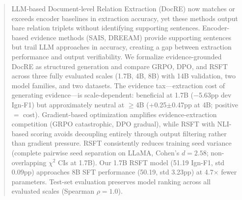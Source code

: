\begin{abstract}
LLM-based Document-level Relation Extraction (DocRE) now matches or exceeds encoder baselines in extraction accuracy, yet these methods output bare relation triplets without identifying supporting sentences. Encoder-based evidence methods (SAIS, DREEAM) provide supporting sentences but trail LLM approaches in accuracy, creating a gap between extraction performance and output verifiability.
We formalize evidence-grounded DocRE as structured generation and compare GRPO, DPO, and RSFT across three fully evaluated scales (1.7B, 4B, 8B) with 14B validation, two model families, and two datasets. The evidence tax---extraction cost of generating evidence---is scale-dependent: beneficial at 1.7B ($-$5.63pp dev Ign-F1) but approximately neutral at $\geq$4B (+0.25$\pm$0.47pp at 4B; positive $=$ cost). Gradient-based optimization amplifies evidence-extraction competition (GRPO catastrophic, DPO gradual), while RSFT with NLI-based scoring avoids decoupling entirely through output filtering rather than gradient pressure.
RSFT consistently reduces training seed variance (complete pairwise seed separation on LLaMA, Cohen's $d{=}2.58$; non-overlapping $\chi^2$ CIs at 1.7B). Our 1.7B RSFT model (51.19 Ign-F1, std 0.09pp) approaches 8B SFT performance (50.19, std 3.23pp) at 4.7$\times$ fewer parameters. Test-set evaluation preserves model ranking across all evaluated scales (Spearman $\rho{=}1.0$).
\end{abstract}
